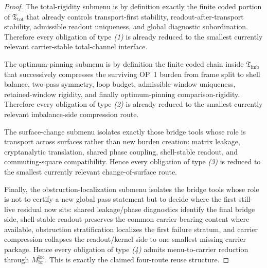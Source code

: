 \begin{proof}
The total-rigidity submenu is by definition exactly the finite coded portion of \(\mathfrak T_{\mathrm{tot}}\) that already controls transport-first stability, readout-after-transport stability, admissible readout uniqueness, and global diagnostic subordination. Therefore every obligation of type \emph{(1)} is already reduced to the smallest currently relevant carrier-stable total-channel interface.

The optimum-pinning submenu is by definition the finite coded chain inside \(\mathfrak T_{\mathrm{imb}}\) that successively compresses the surviving OP~1 burden from frame split to shell balance, two-pass symmetry, loop budget, admissible-window uniqueness, retained-window rigidity, and finally optimum-pinning comparison-rigidity. Therefore every obligation of type \emph{(2)} is already reduced to the smallest currently relevant imbalance-side compression route.

The surface-change submenu isolates exactly those bridge tools whose role is transport across surfaces rather than new burden creation: matrix leakage, cryptanalytic translation, shared phase coupling, shell-stable readout, and commuting-square compatibility. Hence every obligation of type \emph{(3)} is reduced to the smallest currently relevant change-of-surface route.

Finally, the obstruction-localization submenu isolates the bridge tools whose role is not to certify a new global pass statement but to decide where the first still-live residual now sits: shared leakage/phase diagnostics identify the final bridge side, shell-stable readout preserves the common carrier-bearing content where available, obstruction stratification localizes the first failure stratum, and carrier compression collapses the readout/kernel side to one smallest missing carrier package. Hence every obligation of type \emph{(4)} admits menu-to-carrier reduction through \(M^{\mathrm{loc}}_{\mathrm{br}}\). This is exactly the claimed four-route reuse structure.
\end{proof}

